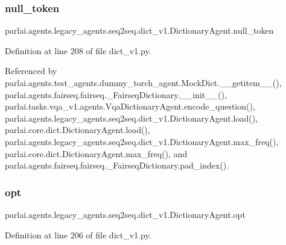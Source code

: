 \subsubsection{\texorpdfstring{null\+\_\+token}{null\_token}}
{\footnotesize\ttfamily parlai.\+agents.\+legacy\+\_\+agents.\+seq2seq.\+dict\+\_\+v1.\+Dictionary\+Agent.\+null\+\_\+token}



Definition at line 208 of file dict\+\_\+v1.\+py.



Referenced by parlai.\+agents.\+test\+\_\+agents.\+dummy\+\_\+torch\+\_\+agent.\+Mock\+Dict.\+\_\+\+\_\+getitem\+\_\+\+\_\+(), parlai.\+agents.\+fairseq.\+fairseq.\+\_\+\+Fairseq\+Dictionary.\+\_\+\+\_\+init\+\_\+\+\_\+(), parlai.\+tasks.\+vqa\+\_\+v1.\+agents.\+Vqa\+Dictionary\+Agent.\+encode\+\_\+question(), parlai.\+agents.\+legacy\+\_\+agents.\+seq2seq.\+dict\+\_\+v1.\+Dictionary\+Agent.\+load(), parlai.\+core.\+dict.\+Dictionary\+Agent.\+load(), parlai.\+agents.\+legacy\+\_\+agents.\+seq2seq.\+dict\+\_\+v1.\+Dictionary\+Agent.\+max\+\_\+freq(), parlai.\+core.\+dict.\+Dictionary\+Agent.\+max\+\_\+freq(), and parlai.\+agents.\+fairseq.\+fairseq.\+\_\+\+Fairseq\+Dictionary.\+pad\+\_\+index().

\mbox{\label{classparlai_1_1agents_1_1legacy__agents_1_1seq2seq_1_1dict__v1_1_1DictionaryAgent_a18f2b1e7b9b1f7e8f483dd7fd99f95ef}} 
\subsubsection{\texorpdfstring{opt}{opt}}
{\footnotesize\ttfamily parlai.\+agents.\+legacy\+\_\+agents.\+seq2seq.\+dict\+\_\+v1.\+Dictionary\+Agent.\+opt}



Definition at line 206 of file dict\+\_\+v1.\+py.



